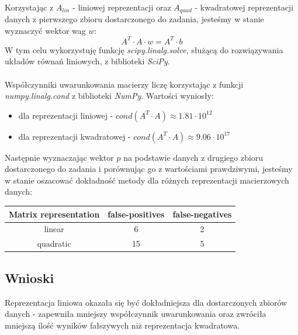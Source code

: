 \documentclass{article}
\begin{document}
\\
Korzystając z $A_{lin}$ - liniowej reprezentacji oraz $A_{quad}$ - 
kwadratowej reprezentacji danych z pierwszego zbioru dostarczonego do zadania, jesteśmy w 
stanie wyznaczyć wektor wag $w$:
$$ A^T \cdot A \cdot w = A^T \cdot b$$
W tym celu wykorzystuję funkcję \textit{scipy.linalg.solve}, służącą do rozwiązywania 
układów równań liniowych, z biblioteki \textit{SciPy}. \\\\
Współczynniki uwarunkowania macierzy liczę korzystając z funkcji \textit{numpy.linalg.cond} 
z biblioteki \textit{NumPy}.
Wartości wyniosły:
\begin{itemize}
  \item dla reprezentacji liniowej - $cond(A^T\cdot A)\approx 1.81\cdot 10^{12}$
  \item dla reprezentacji kwadratowej - $cond(A^T\cdot A)\approx 9.06\cdot 10^{17}$
\end{itemize}
Następnie wyznaczając wektor $p$ na podstawie danych z drugiego zbioru dostarczonego do
zadania i porównując go z wartościami prawdziwymi, jesteśmy w stanie oszacować dokładność
metody dla różnych reprezentacji macierzowych danych:
\begin{center}
  \begin{tabular}{  |c|c|c| } 
   \hline
   Matrix representation & false-positives & false-negatives\\
   \hline
   linear & 6 & 2\\
   \hline
   quadratic & 15 & 5\\
   \hline
  \end{tabular}
\end{center}
\subsection*{Wnioski}
\null\quad Reprezentacja liniowa okazała się być dokładniejsza dla dostarczonych
zbiorów danych - zapewniła mniejszy współczynnik uwarunkowania oraz zwróciła mniejszą
ilość wyników fałszywych niż reprezentacja kwadratowa.
\end{document}

